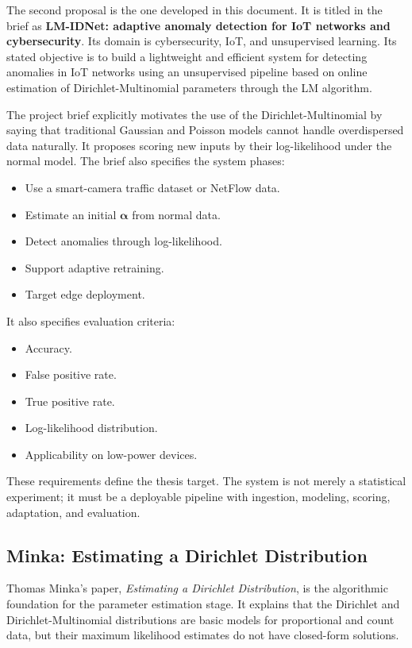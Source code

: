 \documentclass[11pt,a4paper]{article}
\begin{document}
The second proposal is the one developed in this document. It is titled in the brief as \textbf{LM-IDNet: adaptive anomaly detection for IoT networks and cybersecurity}. Its domain is cybersecurity, IoT, and unsupervised learning. Its stated objective is to build a lightweight and efficient system for detecting anomalies in IoT networks using an unsupervised pipeline based on online estimation of Dirichlet-Multinomial parameters through the LM algorithm.

The project brief explicitly motivates the use of the Dirichlet-Multinomial by saying that traditional Gaussian and Poisson models cannot handle overdispersed data naturally. It proposes scoring new inputs by their log-likelihood under the normal model. The brief also specifies the system phases:

\begin{itemize}
  \item Use a smart-camera traffic dataset or NetFlow data.
  \item Estimate an initial \(\boldsymbol{\alpha}\) from normal data.
  \item Detect anomalies through log-likelihood.
  \item Support adaptive retraining.
  \item Target edge deployment.
\end{itemize}

It also specifies evaluation criteria:

\begin{itemize}
  \item Accuracy.
  \item False positive rate.
  \item True positive rate.
  \item Log-likelihood distribution.
  \item Applicability on low-power devices.
\end{itemize}

These requirements define the thesis target. The system is not merely a statistical experiment; it must be a deployable pipeline with ingestion, modeling, scoring, adaptation, and evaluation.

\subsection{Minka: Estimating a Dirichlet Distribution}

Thomas Minka's paper, \textit{Estimating a Dirichlet Distribution}, is the algorithmic foundation for the parameter estimation stage. It explains that the Dirichlet and Dirichlet-Multinomial distributions are basic models for proportional and count data, but their maximum likelihood estimates do not have closed-form solutions.
\end{document}
